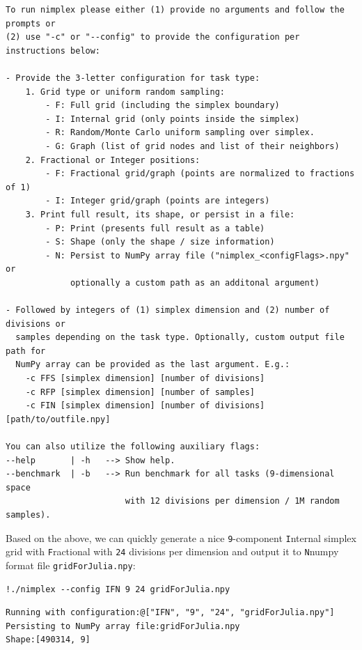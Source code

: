 \begin{verbatim}
To run nimplex please either (1) provide no arguments and follow the prompts or 
(2) use "-c" or "--config" to provide the configuration per instructions below:

- Provide the 3-letter configuration for task type:
    1. Grid type or uniform random sampling:
        - F: Full grid (including the simplex boundary)
        - I: Internal grid (only points inside the simplex)
        - R: Random/Monte Carlo uniform sampling over simplex.
        - G: Graph (list of grid nodes and list of their neighbors)
    2. Fractional or Integer positions:
        - F: Fractional grid/graph (points are normalized to fractions of 1)
        - I: Integer grid/graph (points are integers)
    3. Print full result, its shape, or persist in a file:
        - P: Print (presents full result as a table)
        - S: Shape (only the shape / size information)
        - N: Persist to NumPy array file ("nimplex_<configFlags>.npy" or 
             optionally a custom path as an additonal argument)

- Followed by integers of (1) simplex dimension and (2) number of divisions or
  samples depending on the task type. Optionally, custom output file path for 
  NumPy array can be provided as the last argument. E.g.:
    -c FFS [simplex dimension] [number of divisions]
    -c RFP [simplex dimension] [number of samples]
    -c FIN [simplex dimension] [number of divisions] [path/to/outfile.npy]

You can also utilize the following auxiliary flags:
--help       | -h   --> Show help.
--benchmark  | -b   --> Run benchmark for all tasks (9-dimensional space
                        with 12 divisions per dimension / 1M random samples).
\end{verbatim}

Based on the above, we can quickly generate a nice
\texttt{9}-component \texttt{I}nternal
simplex grid with \texttt{F}ractional with
\texttt{24} divisions per dimension and output it to
\texttt{N}numpy format file
\texttt{gridForJulia.npy}:

\begin{verbatim}
!./nimplex --config IFN 9 24 gridForJulia.npy
\end{verbatim}

\begin{verbatim}
Running with configuration:@["IFN", "9", "24", "gridForJulia.npy"]
Persisting to NumPy array file:gridForJulia.npy
Shape:[490314, 9]
\end{verbatim}

